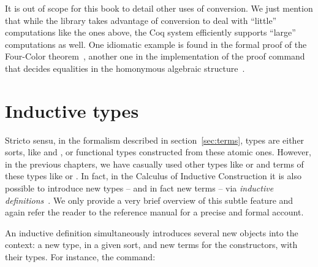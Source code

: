 It is out of scope for this book to detail other uses of
conversion. We just mention that while the \mcbMC{} library takes
advantage of conversion to deal with ``little'' computations like
the ones above, the Coq system efficiently supports ``large''
computations as well. One idiomatic example is found in the formal proof
of the Four-Color theorem~\cite{Gonthier08}, another one in
the implementation of the proof command  that decides
equalities in the
homonymous algebraic structure~\cite{gregoire:hal-00819484}.





\section{Inductive types}\label{ssec:indtypes}

Stricto sensu, in the formalism described in section~\ref{sec:terms},
types are either sorts, like  and , or functional
types constructed from these atomic ones. However, in the previous
chapters, we have casually used other types like  or 
and terms of these types like  or .
In fact, in the Calculus of Inductive Construction it is also possible
to introduce new types -- and in fact new terms -- via
\emph{inductive definitions}~\cite{CoPa89, Moh93}. We only provide a
very brief overview of this subtle feature and again refer the reader
to the reference manual for a precise and formal account.

An inductive definition simultaneously introduces
several new objects into the context: a new type, in a given sort, and
new terms for the constructors, with their types. For instance, the
command:

